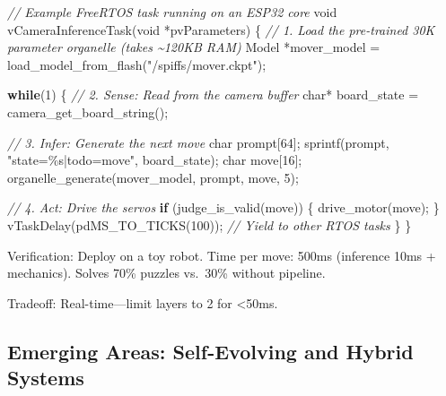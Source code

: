 \documentclass[
]{article}
\newenvironment{Shaded}{}{}
\newcommand{\CommentTok}[1]{\textcolor[rgb]{0.38,0.63,0.69}{\textit{#1}}}
\newcommand{\ControlFlowTok}[1]{\textcolor[rgb]{0.00,0.44,0.13}{\textbf{#1}}}
\newcommand{\DataTypeTok}[1]{\textcolor[rgb]{0.56,0.13,0.00}{#1}}
\newcommand{\DecValTok}[1]{\textcolor[rgb]{0.25,0.63,0.44}{#1}}
\newcommand{\NormalTok}[1]{#1}
\newcommand{\OperatorTok}[1]{\textcolor[rgb]{0.40,0.40,0.40}{#1}}
\newcommand{\SpecialCharTok}[1]{\textcolor[rgb]{0.25,0.44,0.63}{#1}}
\newcommand{\StringTok}[1]{\textcolor[rgb]{0.25,0.44,0.63}{#1}}
\begin{document}
\begin{Shaded}
\begin{Highlighting}[]
\CommentTok{// Example FreeRTOS task running on an ESP32 core}
\DataTypeTok{void}\NormalTok{ vCameraInferenceTask}\OperatorTok{(}\DataTypeTok{void} \OperatorTok{*}\NormalTok{pvParameters}\OperatorTok{)} \OperatorTok{\{}
    \CommentTok{// 1. Load the pre{-}trained 30K parameter organelle (takes \textasciitilde{}120KB RAM)}
\NormalTok{    Model }\OperatorTok{*}\NormalTok{mover\_model }\OperatorTok{=}\NormalTok{ load\_model\_from\_flash}\OperatorTok{(}\StringTok{"/spiffs/mover.ckpt"}\OperatorTok{);}
    
    \ControlFlowTok{while}\OperatorTok{(}\DecValTok{1}\OperatorTok{)} \OperatorTok{\{}
        \CommentTok{// 2. Sense: Read from the camera buffer}
        \DataTypeTok{char}\OperatorTok{*}\NormalTok{ board\_state }\OperatorTok{=}\NormalTok{ camera\_get\_board\_string}\OperatorTok{();}
        
        \CommentTok{// 3. Infer: Generate the next move}
        \DataTypeTok{char}\NormalTok{ prompt}\OperatorTok{[}\DecValTok{64}\OperatorTok{];}
\NormalTok{        sprintf}\OperatorTok{(}\NormalTok{prompt}\OperatorTok{,} \StringTok{"state=}\SpecialCharTok{\%s}\StringTok{|todo=move"}\OperatorTok{,}\NormalTok{ board\_state}\OperatorTok{);}
        \DataTypeTok{char}\NormalTok{ move}\OperatorTok{[}\DecValTok{16}\OperatorTok{];}
\NormalTok{        organelle\_generate}\OperatorTok{(}\NormalTok{mover\_model}\OperatorTok{,}\NormalTok{ prompt}\OperatorTok{,}\NormalTok{ move}\OperatorTok{,} \DecValTok{5}\OperatorTok{);}
        
        \CommentTok{// 4. Act: Drive the servos}
        \ControlFlowTok{if} \OperatorTok{(}\NormalTok{judge\_is\_valid}\OperatorTok{(}\NormalTok{move}\OperatorTok{))} \OperatorTok{\{}
\NormalTok{            drive\_motor}\OperatorTok{(}\NormalTok{move}\OperatorTok{);}
        \OperatorTok{\}}
\NormalTok{        vTaskDelay}\OperatorTok{(}\NormalTok{pdMS\_TO\_TICKS}\OperatorTok{(}\DecValTok{100}\OperatorTok{));} \CommentTok{// Yield to other RTOS tasks}
    \OperatorTok{\}}
\OperatorTok{\}}
\end{Highlighting}
\end{Shaded}

Verification: Deploy on a toy robot. Time per move: 500ms (inference
10ms + mechanics). Solves 70\% puzzles vs.~30\% without pipeline.

Tradeoff: Real-time---limit layers to 2 for \textless50ms.

\subsection{Emerging Areas: Self-Evolving and Hybrid
Systems}\label{emerging-areas-self-evolving-and-hybrid-systems}
\end{document}
